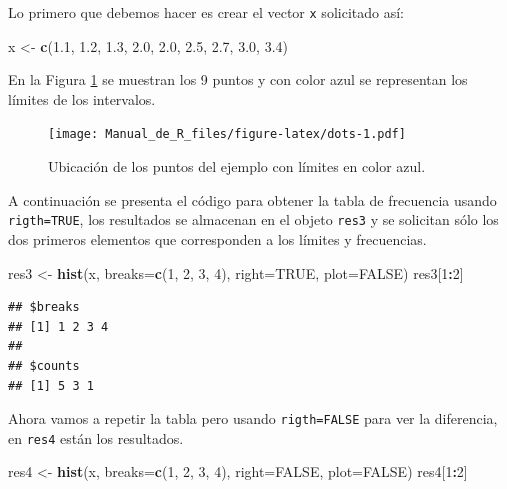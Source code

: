 \documentclass[10pt,]{krantz}
\makeatletter
\newenvironment{Shaded}{\begin{snugshade}}{\end{snugshade}}
\newcommand{\KeywordTok}[1]{\textcolor[rgb]{0.13,0.29,0.53}{\textbf{#1}}}
\newcommand{\DataTypeTok}[1]{\textcolor[rgb]{0.13,0.29,0.53}{#1}}
\newcommand{\DecValTok}[1]{\textcolor[rgb]{0.00,0.00,0.81}{#1}}
\newcommand{\FloatTok}[1]{\textcolor[rgb]{0.00,0.00,0.81}{#1}}
\newcommand{\StringTok}[1]{\textcolor[rgb]{0.31,0.60,0.02}{#1}}
\newcommand{\OtherTok}[1]{\textcolor[rgb]{0.56,0.35,0.01}{#1}}
\newcommand{\OperatorTok}[1]{\textcolor[rgb]{0.81,0.36,0.00}{\textbf{#1}}}
\newcommand{\NormalTok}[1]{#1}
\newenvironment{kframe}{%
\medskip{}
\setlength{\fboxsep}{.8em}
 \def\at@end@of@kframe{}%
 \ifinner\ifhmode%
  \def\at@end@of@kframe{\end{minipage}}%
  \begin{minipage}{\columnwidth}%
 \fi\fi%
 \def\FrameCommand##1{\hskip\@totalleftmargin \hskip-\fboxsep
 \colorbox{shadecolor}{##1}\hskip-\fboxsep
     \hskip-\linewidth \hskip-\@totalleftmargin \hskip\columnwidth}%
 \MakeFramed {\advance\hsize-\width
   \@totalleftmargin\z@ \linewidth\hsize
   \@setminipage}}%
 {\par\unskip\endMakeFramed%
 \at@end@of@kframe}
\renewenvironment{Shaded}{\begin{kframe}}{\end{kframe}}
\makeatother
\begin{document}
Lo primero que debemos hacer es crear el vector \texttt{x} solicitado
así:

\begin{Shaded}
\begin{Highlighting}[]
\NormalTok{x <-}\StringTok{ }\KeywordTok{c}\NormalTok{(}\FloatTok{1.1}\NormalTok{, }\FloatTok{1.2}\NormalTok{, }\FloatTok{1.3}\NormalTok{, }\FloatTok{2.0}\NormalTok{, }\FloatTok{2.0}\NormalTok{, }\FloatTok{2.5}\NormalTok{, }\FloatTok{2.7}\NormalTok{, }\FloatTok{3.0}\NormalTok{, }\FloatTok{3.4}\NormalTok{)}
\end{Highlighting}
\end{Shaded}

En la Figura \ref{fig:dots} se muestran los 9 puntos y con color azul se
representan los límites de los intervalos.

\begin{figure}
\centering
\texttt{[image: Manual\_de\_R\_files/figure-latex/dots-1.pdf]}
\caption{\label{fig:dots}Ubicación de los puntos del ejemplo con límites en
color azul.}
\end{figure}

A continuación se presenta el código para obtener la tabla de frecuencia
usando \texttt{rigth=TRUE}, los resultados se almacenan en el objeto
\texttt{res3} y se solicitan sólo los dos primeros elementos que
corresponden a los límites y frecuencias.

\begin{Shaded}
\begin{Highlighting}[]
\NormalTok{res3 <-}\StringTok{ }\KeywordTok{hist}\NormalTok{(x, }\DataTypeTok{breaks=}\KeywordTok{c}\NormalTok{(}\DecValTok{1}\NormalTok{, }\DecValTok{2}\NormalTok{, }\DecValTok{3}\NormalTok{, }\DecValTok{4}\NormalTok{), }\DataTypeTok{right=}\OtherTok{TRUE}\NormalTok{, }\DataTypeTok{plot=}\OtherTok{FALSE}\NormalTok{)}
\NormalTok{res3[}\DecValTok{1}\OperatorTok{:}\DecValTok{2}\NormalTok{]}
\end{Highlighting}
\end{Shaded}

\begin{verbatim}
## $breaks
## [1] 1 2 3 4
## 
## $counts
## [1] 5 3 1
\end{verbatim}

Ahora vamos a repetir la tabla pero usando \texttt{rigth=FALSE} para ver
la diferencia, en \texttt{res4} están los resultados.

\begin{Shaded}
\begin{Highlighting}[]
\NormalTok{res4 <-}\StringTok{ }\KeywordTok{hist}\NormalTok{(x, }\DataTypeTok{breaks=}\KeywordTok{c}\NormalTok{(}\DecValTok{1}\NormalTok{, }\DecValTok{2}\NormalTok{, }\DecValTok{3}\NormalTok{, }\DecValTok{4}\NormalTok{), }\DataTypeTok{right=}\OtherTok{FALSE}\NormalTok{, }\DataTypeTok{plot=}\OtherTok{FALSE}\NormalTok{)}
\NormalTok{res4[}\DecValTok{1}\OperatorTok{:}\DecValTok{2}\NormalTok{]}
\end{Highlighting}
\end{Shaded}
\end{document}
